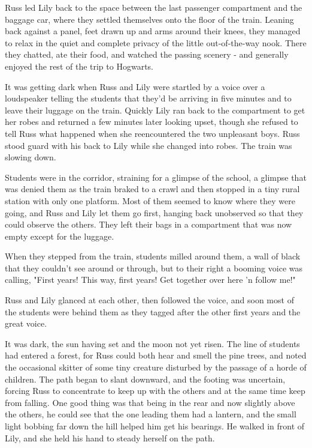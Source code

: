 Russ led Lily back to the space between the last passenger compartment and the baggage car, where they settled themselves onto the floor of the train. Leaning back against a panel, feet drawn up and arms around their knees, they managed to relax in the quiet and complete privacy of the little out-of-the-way nook. There they chatted, ate their food, and watched the passing scenery - and generally enjoyed the rest of the trip to Hogwarts.

It was getting dark when Russ and Lily were startled by a voice over a loudspeaker telling the students that they'd be arriving in five minutes and to leave their luggage on the train. Quickly Lily ran back to the compartment to get her robes and returned a few minutes later looking upset, though she refused to tell Russ what happened when she reencountered the two unpleasant boys. Russ stood guard with his back to Lily while she changed into robes. The train was slowing down.

Students were in the corridor, straining for a glimpse of the school, a glimpse that was denied them as the train braked to a crawl and then stopped in a tiny rural station with only one platform. Most of them seemed to know where they were going, and Russ and Lily let them go first, hanging back unobserved so that they could observe the others. They left their bags in a compartment that was now empty except for the luggage.

When they stepped from the train, students milled around them, a wall of black that they couldn't see around or through, but to their right a booming voice was calling, "First years! This way, first years! Get together over here 'n follow me!"

Russ and Lily glanced at each other, then followed the voice, and soon most of the students were behind them as they tagged after the other first years and the great voice.

It was dark, the sun having set and the moon not yet risen. The line of students had entered a forest, for Russ could both hear and smell the pine trees, and noted the occasional skitter of some tiny creature disturbed by the passage of a horde of children. The path began to slant downward, and the footing was uncertain, forcing Russ to concentrate to keep up with the others and at the same time keep from falling. One good thing was that being in the rear and now slightly above the others, he could see that the one leading them had a lantern, and the small light bobbing far down the hill helped him get his bearings. He walked in front of Lily, and she held his hand to steady herself on the path.

